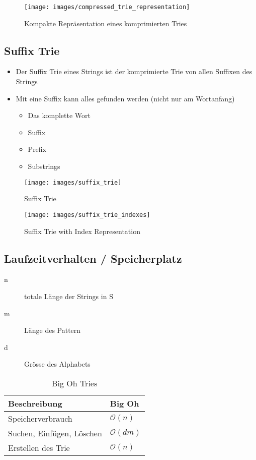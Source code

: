 \begin{figure}[h]
\centering
\texttt{[image: images/compressed\_trie\_representation]}
\caption{Kompakte Repräsentation eines komprimierten Tries}
\label{fig:compressedtrierepresentation}
\end{figure}

\subsection{Suffix Trie}
\begin{itemize}
	\item Der Suffix Trie eines Strings ist der komprimierte Trie von allen Suffixen des Strings
	\item Mit eine Suffix kann alles gefunden werden (nicht nur am Wortanfang)
	\begin{itemize}
		\item Das komplette Wort
		\item Suffix
		\item Prefix
		\item Substrings
	\end{itemize}
\end{itemize}
\begin{figure}[ht!]
	\centering
	\begin{minipage}[t]{0.4\textwidth}
		\centering
		\texttt{[image: images/suffix\_trie]}
		\caption{Suffix Trie}
		\label{fig:suffixtrie}
	\end{minipage}
	\begin{minipage}[t]{0.4\textwidth}
		\centering
		\texttt{[image: images/suffix\_trie\_indexes]}
		\caption{Suffix Trie with Index Representation}
		\label{fig:suffixtrieindexes}
	\end{minipage}
\end{figure}


\subsection{Laufzeitverhalten / Speicherplatz}
\begin{description}
	\item[n] totale Länge der Strings in S
	\item[m] Länge des Pattern
	\item[d] Grösse des Alphabets
\end{description}
\begin{table}[h]
	\centering
	\begin{tabu} to \linewidth {l l}
		\toprule
		Beschreibung & Big Oh \\
		\midrule
		Speicherverbrauch & $\mathcal{O}(n)$ \\
		Suchen, Einfügen, Löschen & $\mathcal{O}(dm)$ \\
		Erstellen des Trie & $\mathcal{O}(n)$ \\		\bottomrule
	\end{tabu}
	\caption{Big Oh Tries}
\end{table}

